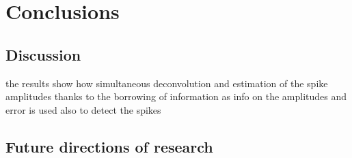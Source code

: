 \chapter*{Conclusions} %
\label{ch5}
\setlength{\parskip}{0.5pt}



\section*{Discussion}

the results show how simultaneous deconvolution and estimation of the spike amplitudes
thanks to the borrowing of information 
as info on the amplitudes and error is used also to detect the spikes


\section*{Future directions of research}









